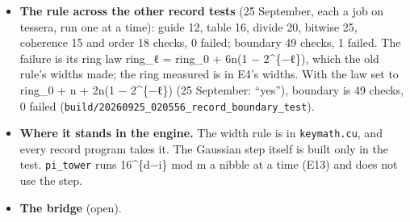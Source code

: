 \begin{itemize}
\begin{itemize}
\item the program imprints, lays and loads, and floor k is 24 + ⌈k/2⌉ bits wide: 25, 25, 26, 26, 27, 27, 28 and 28;
\item some lane fills every floor's width, |value| ≥ 2\textasciicircum{}\{bits − 1\}, and no width is loose;
\item the device equals the host word for word;
\item every floor equals z(1 + i)\textasciicircum{}k, taken on the CPU from the powers above;
\item floor 4 is −4z and floor 8 is 16z on every lane;
\item each floor's two registers share their parity;
\item floor 8's values lie in [−2\textasciicircum{}27, 2\textasciicircum{}27), 28 bits, and reach −2\textasciicircum{}27;
\item eight inverse floors take 16z back through z(1 + i)\textasciicircum{}\{8−k\} to z on every lane, in the host's records and the device's alike;
\item the chosen pairs w(1 + i)\textasciicircum{}k, for k from 0 to 9 with six drawn w of valuation 0, and then 0, have valuation k on the CPU;
\item through 1 to 8 inverse floors the host and the device agree on every run, j inverse floors refuse a pair exactly where (1 + i)\textasciicircum{}j does not divide it, and where they run each level is z/(1 + i)\textasciicircum{}k, the Gaussian division on the CPU. The run printed 272 runs and 216 refused. Derived: 61 pairs through 8 floor counts are 488 runs; a pair of valuation k runs the j ≤ min(k, 8) of them, 6·(0 + 1 + … + 8 + 8) + 8 = 272, and 488 − 272 = 216;
\item tessera admits the job and it releases.
\end{itemize}
\item \textbf{The rule across the other record tests} (25 September, each a job on tessera, run one at a time): guide 12, table 16, divide 20, bitwise 25, coherence 15 and order 18 checks, 0 failed; boundary 49 checks, 1 failed. The failure is its ring law ring\_\allowbreak{}ℓ = ring\_\allowbreak{}0 + 6n(1 − 2\textasciicircum{}\{−ℓ\}), which the old rule's widths made; the ring measured is in E4's widths. With the law set to ring\_\allowbreak{}0 + n + 2n(1 − 2\textasciicircum{}\{−ℓ\}) (25 September: “yes”), boundary is 49 checks, 0 failed (\texttt{build/\allowbreak{}20260925\_\allowbreak{}020556\_\allowbreak{}record\_\allowbreak{}boundary\_\allowbreak{}test}).
\item \textbf{Where it stands in the engine.} The width rule is in \texttt{keymath.\allowbreak{}cu}, and every record program takes it. The Gaussian step itself is built only in the test. \texttt{pi\_\allowbreak{}tower} runs 16\textasciicircum{}\{d−i\} mod m a nibble at a time (E13) and does not use the step.
\item \textbf{The bridge} (open).


\end{itemize}
